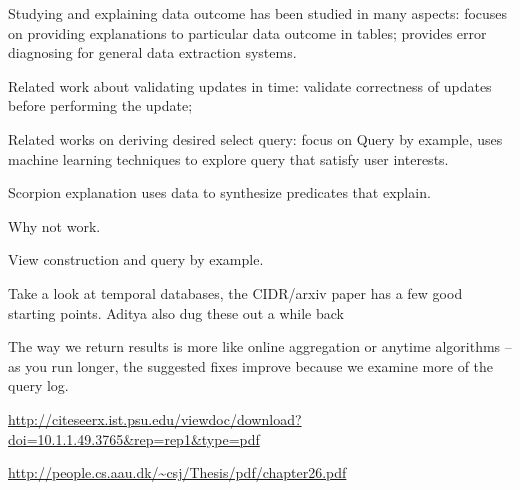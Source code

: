 

\cite{Golab2008,GolabKKS10 } 

Studying and explaining
data outcome has been studied in many aspects:
\cite{GebalyAGKS14}
focuses on providing 
explanations to particular data outcome in tables; \cite{wang2015}
provides error diagnosing for general data extraction systems. 


Related work about validating updates in time: 
\cite{Chen2011} validate correctness of updates before performing the update;


Related works on deriving desired select query: focus on 
Query by example, \cite{dimitriadou2014explore}  uses machine learning
techniques to explore query that satisfy user interests. 


\cite{mucslu2013data}



Scorpion explanation uses data to synthesize predicates that explain.

Why not work.

View construction and query by example.

Take a look at temporal databases, the CIDR/arxiv paper has a few good starting points. Aditya also dug these out a while back


The way we return results is more like online aggregation or anytime algorithms -- 
as you run longer, the suggested fixes improve because we examine more of the query log.

\url{http://citeseerx.ist.psu.edu/viewdoc/download?doi=10.1.1.49.3765&rep=rep1&type=pdf}

\url{http://people.cs.aau.dk/~csj/Thesis/pdf/chapter26.pdf}
